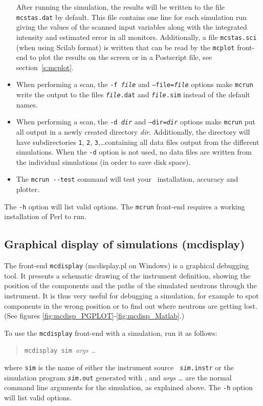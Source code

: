 \begin{itemize}
After running the simulation, the results will be written to the file
\verb+mcstas.dat+ by default. This file contains one line for each simulation
run giving the values of the scanned input variables along with the integrated
intensity and estimated error in all monitors. Additionally, a file
\verb+mcstas.sci+ (when using Scilab format) is written that can be read by the
\verb+mcplot+ front-end to plot the results on the screen or in a Postscript
file, see section~\ref{s:mcplot}. 
\item When performing a scan, the \texttt{-f {\it file}} and
  \texttt{--file={\it file}} options make \verb+mcrun+ write the output
  to the files \texttt{{\it file\/}.dat} and \texttt{{\it file\/}.sim}
  instead of the default names.
\item When performing a scan, the \texttt{-d {\it dir}} and
  \texttt{--dir={\it dir}} options make \verb+mcrun+ put all output in a
  newly created directory \textit{dir}. Additionally, the directory will
  have subdirectories \verb+1+, \verb+2+, \verb+3+,\ldots containing all
  data files output from the different simulations. When the \verb+-d+
  option is not used, no data files are written from the individual
  simulations (in order to save disk space).
\item The \verb+mcrun --test+ command will test your \MCS\ installation,
  accuracy and plotter. 
\end{itemize}

The \verb+-h+ option will list valid options. The \verb+mcrun+ front-end
requires a working installation of Perl to run.


\subsection{Graphical display of simulations (mcdisplay)}
\label{s:mcdisplay}

The front-end \verb+mcdisplay+ (mcdisplay.pl on Windows) is a graphical
debugging tool.  It presents a schematic drawing of the instrument definition,
showing the position of the components and the paths of the simulated neutrons
through the instrument. It is thus very useful for debugging a simulation, for
example to spot components in the wrong position or to find out where neutrons
are getting lost.  (See figures
\ref{fig:mcdisp_PGPLOT}-\ref{fig:mcdisp_Matlab}.)

To use the \verb+mcdisplay+ front-end with a simulation, run it as
follows:
\begin{quote}
  \verb+mcdisplay sim +{\it args \ldots}
\end{quote}
where \verb+sim+ is the name of either the instrument source \texttt{{\it
    sim}.instr} or the simulation program \texttt{{\it sim}.out} generated with
\MCS, and \textit{args \ldots} are the normal command line arguments for the
simulation, as explained above. The \verb+-h+ option will list valid options.

